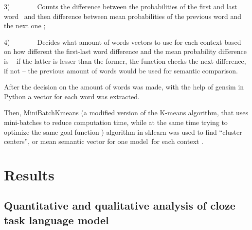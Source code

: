 \documentclass[a4paper]{article}
\begin{document}
3)        Counts the difference between the probabilities of the first and last word
 and then difference between mean probabilities of the previous word and the next one
;

4)        Decides what amount of words vectors to use for each context based on how different the first-last word difference and the mean probability difference is – if the latter is lesser than the former, the function checks the next difference, if not – the previous amount of words would be used for semantic comparison.

After the decision on the amount of words was made, with the help of gensim in Python a vector for each word was extracted.

Then, MiniBatchKmeans (a modified version of the K-means algorithm,
that uses mini-batches to reduce computation time, while at the same
time trying to optimize the same goal function \cite{bejar}) algorithm in sklearn was used to find “cluster centers”, or mean semantic vector for one model for each context
.

%
%
%
%
%
%
%

\section{Results}

\subsection{Quantitative and qualitative analysis of cloze task
language model} %
\end{document}
